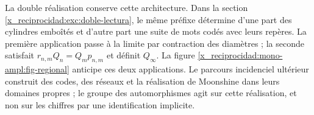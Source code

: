 La double réalisation conserve cette architecture. Dans la section
\ref{x_reciprocidad:exc:doble-lectura}, le même préfixe détermine d'une part des cylindres
emboîtés et d'autre part une suite de mots codés avec leurs repères.
La première application passe à la limite par contraction des diamètres ; la seconde
satisfait \(r_{n,m}Q_n=Q_mp_{n,m}\) et définit \(Q_\infty\).
La figure \ref{x_reciprocidad:mono-ampl:fig-regional} anticipe ces deux applications.
Le parcours incidenciel ultérieur construit des codes, des réseaux et la
réalisation de Moonshine dans leurs domaines propres ; le groupe des automorphismes
agit sur cette réalisation, et non sur les chiffres par une identification
implicite.



